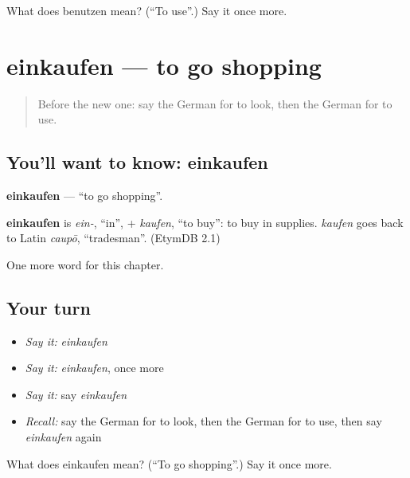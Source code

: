 \begin{tcolorbox}[breakable,colback=teal!4,colframe=teal!35!black,title={Before you move on}]
What does benutzen mean? (\textquotedblleft{}To use\textquotedblright{}.) Say it once more.
\end{tcolorbox}
\section[einkaufen]{einkaufen — to go shopping}

\label{lesson:GE-C145-einkaufen}



\begin{quote}
Before the new one: say the German for to look, then the German for to use.
\end{quote}

\subsection*{You'll want to know: einkaufen}
\textbf{einkaufen} — \textquotedblleft{}to go shopping\textquotedblright{}.

\begin{cousinweb}
\textbf{einkaufen} is \emph{ein-}, \textquotedblleft{}in\textquotedblright{}, + \emph{kaufen}, \textquotedblleft{}to buy\textquotedblright{}: to buy in supplies. \emph{kaufen} goes back to Latin \emph{caupō}, \textquotedblleft{}tradesman\textquotedblright{}. (EtymDB 2.1)
\end{cousinweb}

\begin{grammarlens}[title={What you've built}]
One more word for this chapter.
\end{grammarlens}

\subsection*{Your turn}
\begin{itemize}
\raggedright
  \item \emph{Say it:} \emph{einkaufen}
  \item \emph{Say it:} \emph{einkaufen}, once more
  \item \emph{Say it:} say \emph{einkaufen}
  \item \emph{Recall:} say the German for to look, then the German for to use, then say \emph{einkaufen} again
\end{itemize}

\begin{tcolorbox}[breakable,colback=teal!4,colframe=teal!35!black,title={Before you move on}]
What does einkaufen mean? (\textquotedblleft{}To go shopping\textquotedblright{}.) Say it once more.
\end{tcolorbox}
